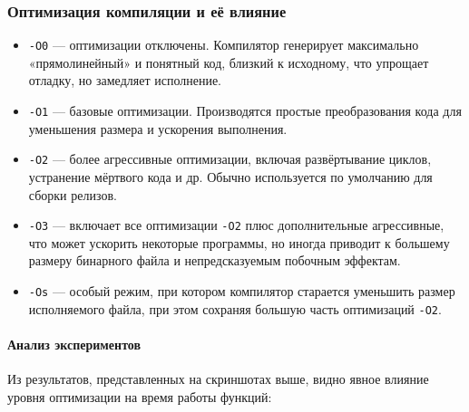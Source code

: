 
\subsubsection{Оптимизация компиляции и её влияние}

\begin{itemize}
    \item \texttt{-O0} — оптимизации отключены. Компилятор генерирует максимально «прямолинейный» и понятный код, близкий к исходному, что упрощает отладку, но замедляет исполнение.
    \item \texttt{-O1} — базовые оптимизации. Производятся простые преобразования кода для уменьшения размера и ускорения выполнения.
    \item \texttt{-O2} — более агрессивные оптимизации, включая развёртывание циклов, устранение мёртвого кода и др. Обычно используется по умолчанию для сборки релизов.
    \item \texttt{-O3} — включает все оптимизации \texttt{-O2} плюс дополнительные агрессивные, что может ускорить некоторые программы, но иногда приводит к большему размеру бинарного файла и непредсказуемым побочным эффектам.
    \item \texttt{-Os} — особый режим, при котором компилятор старается уменьшить размер исполняемого файла, при этом сохраняя большую часть оптимизаций \texttt{-O2}.
\end{itemize}

\paragraph*{Анализ экспериментов}

Из результатов, представленных на скриншотах выше, видно явное влияние уровня оптимизации на время работы функций:

